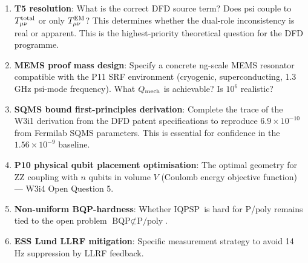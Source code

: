 \documentclass[11pt]{article}
\theoremstyle{definition}
\theoremstyle{remark}
\newcommand{\IQPSP}{\textsc{IQPSP}}
\newcommand{\ee}[1]{\times 10^{#1}}
\begin{document}
\begin{enumerate}
\item \textbf{T5 resolution}: What is the correct DFD source term?
  Does psi couple to $T^{\rm total}_{\mu\nu}$ or only
  $T^{\rm EM}_{\mu\nu}$? This determines whether the dual-role
  inconsistency is real or apparent. This is the highest-priority
  theoretical question for the DFD programme.

\item \textbf{MEMS proof mass design}: Specify a concrete ng-scale MEMS
  resonator compatible with the P11 SRF environment (cryogenic,
  superconducting, 1.3 GHz psi-mode frequency). What $Q_{\rm mech}$
  is achievable? Is $10^6$ realistic?

\item \textbf{SQMS bound first-principles derivation}: Complete the
  trace of the W3i1 derivation from the DFD patent specifications to
  reproduce $6.9\ee{-10}$ from Fermilab SQMS parameters. This is
  essential for confidence in the $1.56\ee{-9}$ baseline.

\item \textbf{P10 physical qubit placement optimisation}: The optimal
  geometry for ZZ coupling with $n$ qubits in volume $V$ (Coulomb
  energy objective function) --- W3i4 Open Question 5.

\item \textbf{Non-uniform BQP-hardness}: Whether \IQPSP\ is hard for
  P/poly remains tied to the open problem $\text{BQP} \not\subset
  \text{P/poly}$.

\item \textbf{ESS Lund LLRF mitigation}: Specific measurement strategy
  to avoid 14 Hz suppression by LLRF feedback.
\end{enumerate}
\end{document}
